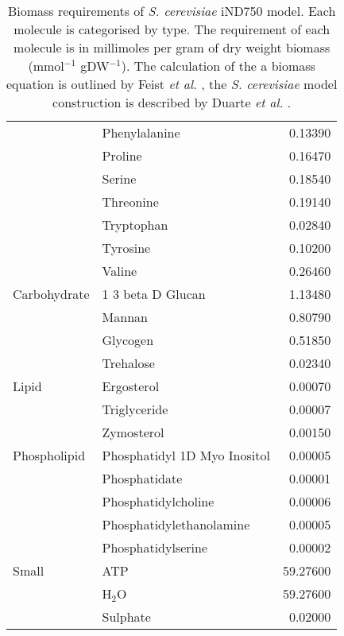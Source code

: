 \begin{table}
\begin{footnotesize}
\begin{tabular}{l l r}
                   & Phenylalanine                  &  0.13390    \\
                   & Proline                        &  0.16470    \\
                   & Serine                         &  0.18540    \\
                   & Threonine                      &  0.19140    \\
                   & Tryptophan                     &  0.02840    \\
                   & Tyrosine                       &  0.10200    \\
                   & Valine                         &  0.26460    \\ \midrule
      Carbohydrate & 1 3 beta D Glucan              &  1.13480    \\
                   & Mannan                         &  0.80790    \\
                   & Glycogen                       &  0.51850    \\
                   & Trehalose                      &  0.02340    \\ \midrule
      Lipid        & Ergosterol                     &  0.00070    \\
                   & Triglyceride                   &  0.00007    \\
                   & Zymosterol                     &  0.00150    \\
      Phospholipid & Phosphatidyl 1D Myo Inositol   &  0.00005    \\
                   & Phosphatidate                  &  0.00001    \\
                   & Phosphatidylcholine            &  0.00006    \\
                   & Phosphatidylethanolamine       &  0.00005    \\
                   & Phosphatidylserine             &  0.00002    \\ \midrule
      Small        & ATP                            & 59.27600    \\
                   & H$_2$O                         & 59.27600    \\
                   & Sulphate                       &  0.02000    \\ \bottomrule
  \end{tabular}
  \end{footnotesize}
  \caption[Biomass requirements of \emph{S. cerevisiae} iND750 model]{Biomass requirements of \emph{S. cerevisiae} iND750 model. Each molecule is categorised by type. The requirement of each molecule is in millimoles per gram of dry weight biomass (mmol$^{-1}$ gDW$^{-1}$). The calculation of the a biomass equation is outlined by Feist \emph{et al.} \cite{feist2009}, the \emph{S. cerevisiae} model construction is described by Duarte \emph{et al.} \cite{duarte2004a}.}
  \label{table:biomass_requirements}
\end{table}

